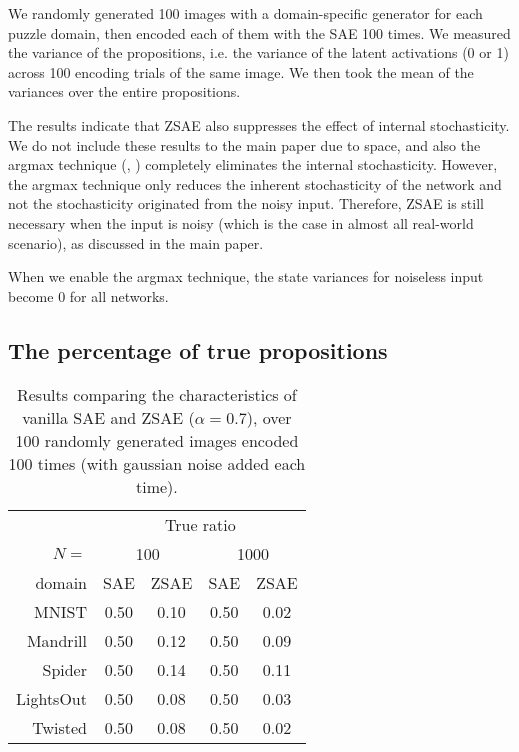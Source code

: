 \documentclass[10pt,letterpaper]{article}
\begin{document}
We randomly generated 100 images with a domain-specific generator for each puzzle domain,
then encoded each of them with the SAE 100 times.
We measured the variance of the propositions, i.e. the variance of the latent activations (0 or 1)
across 100 encoding trials of the same image.
We then took the mean of the variances over the entire propositions.

The results indicate that ZSAE also suppresses the effect of internal stochasticity.
We do not include these results to the main paper due to space,
and also the argmax technique (, )
completely eliminates the internal stochasticity.
However, the argmax technique only reduces the inherent stochasticity of the network
and not the stochasticity originated from the noisy input.
Therefore, ZSAE is still necessary when the input is noisy (which is the case in almost all real-world scenario),
as discussed in the main paper.

When we enable the argmax technique, the state variances for noiseless input become 0 for all networks.

\subsection{The percentage of true propositions}

\begin{table}[htbp]
 \centering
 \setlength{\tabcolsep}{0.45em}
 \begin{tabular}{|r|*{4}{c|}}
       & \multicolumn{4}{c|}{True ratio} \\
$N=$ & \multicolumn{2}{c|}{100} & \multicolumn{2}{c|}{1000} \\
domain    & SAE  & ZSAE & SAE  & ZSAE \\ 
MNIST     & 0.50 & 0.10 & 0.50 & 0.02 \\ 
Mandrill  & 0.50 & 0.12 & 0.50 & 0.09 \\ 
Spider    & 0.50 & 0.14 & 0.50 & 0.11 \\ 
LightsOut & 0.50 & 0.08 & 0.50 & 0.03 \\ 
Twisted   & 0.50 & 0.08 & 0.50 & 0.02 \\ 
\end{tabular}
 \caption{Results comparing the characteristics of vanilla SAE and ZSAE ($\alpha=0.7$),
 over 100 randomly generated images encoded 100 times (with gaussian noise added each time).
 }
\label{tab:trueratio}
\end{table}
\end{document}
